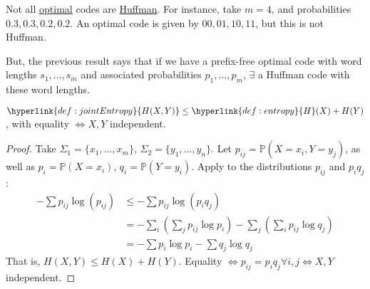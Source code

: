 \documentclass{article}
\newcommand{\Prob}{\mathbb{P}}
\newcommand{\1}[1]{\mathbbm{1}_{#1}}
\begin{document}
\begin{remark}
    Not all \hyperlink{def:optCode}{optimal} codes are \hyperlink{def:huffmanCode}{Huffman}. For instance, take $m=4$, and probabilities $0.3, 0.3, 0.2, 0.2$. An optimal code is given by $00, 01, 10, 11$, but this is not Huffman.

    But, the previous result says that if we have a prefix-free optimal code with word lengths $s_1, \dotsc, s_m$ and associated probabilities $p_1, \dotsc, p_m$, $\exists$ a Huffman code with these word lengths.
\end{remark}


\begin{nlemma}\label{lem:1.7}
    $\hyperlink{def:jointEntropy}{H(X, Y)} \leq \hyperlink{def:entropy}{H}(X) + H(Y)$, with equality $\iff X,Y$ independent.
\end{nlemma}

\begin{proof}
    Take $\Sigma_1 = \{x_1, \dotsc, x_m\}$, $\Sigma_2 = \{y_1, \dotsc, y_n\}$. Let $p_{ij} = \Prob(X=x_i, Y=y_j)$, as well as $p_i = \Prob(X=x_i)$, $q_i = \Prob(Y=y_i)$.
    Apply  to the distributions $p_{ij}$ and $p_i q_j$:
    \begin{align*}
        -\sum p_{ij} \log(p_{ij}) &\leq -\sum p_{ij} \log(p_i q_j) \\
                                  &= - \sum_i \left(\sum_j p_{ij} \log p_i\right) - \sum_j \left(\sum_i p_{ij} \log q_j\right) \\
                                  &= -\sum p_i \log p_i - \sum q_j \log q_j
    \end{align*}
    That is, $H(X,Y) \leq H(X) + H(Y)$.
    Equality $\iff p_{ij} = p_i q_j \forall i, j \iff X, Y$ independent.
\end{proof}
\end{document}
